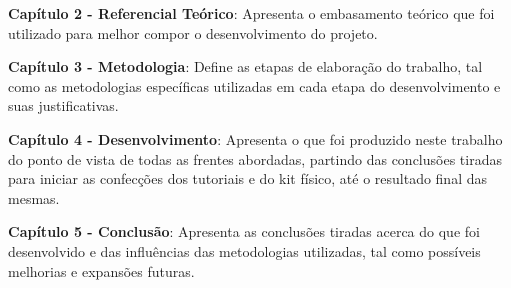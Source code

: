 \textbf{Capítulo 2 - Referencial Teórico}: Apresenta o embasamento teórico que foi utilizado para melhor compor o desenvolvimento do projeto.

\textbf{Capítulo 3 - Metodologia}: Define as etapas de elaboração do trabalho, tal como as metodologias específicas utilizadas em cada etapa do desenvolvimento e suas justificativas.

\textbf{Capítulo 4 - Desenvolvimento}: Apresenta o que foi produzido neste trabalho do ponto de vista de todas as frentes abordadas, partindo das conclusões tiradas para iniciar as confecções dos tutoriais e do kit físico, até o resultado final das mesmas.

\textbf{Capítulo 5 - Conclusão}: Apresenta as conclusões tiradas acerca do que foi desenvolvido e das influências das metodologias utilizadas, tal como possíveis melhorias e expansões futuras.
